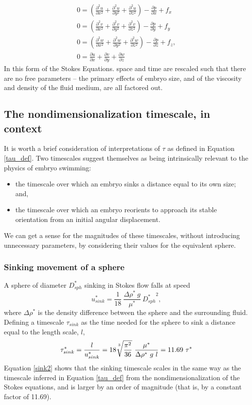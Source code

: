 \documentclass[10pt,a4paper]{article}
\def\non{\nonumber}
\def\p{\partial}
\begin{document}
\begin{eqnarray}\label{Stokes2}
	0 = \left( \frac{\p^2 u}{\p x^2}+\frac{\p^2 u}{\p y^2}+\frac{\p^2 u}{\p z^2} \right) - \frac{\p p}{\p x} + f_x \non \\
	0 = \left( \frac{\p^2 v}{\p x^2}+\frac{\p^2 v}{\p y^2}+\frac{\p^2 v}{\p z^2} \right) - \frac{\p p}{\p y} + f_y \non \\
	0 = \left( \frac{\p^2 w}{\p x^2}+\frac{\p^2 w}{\p y^2}+\frac{\p^2 w}{\p z^2} \right) - \frac{\p p}{\p z} + f_z , \non \\
	0 =  \frac{\p u}{\p {x}}+\frac{\p v}{\p {y}}+\frac{\p w}{\p {z}}
\end{eqnarray}
In this form of the Stokes Equations. space and time are rescaled such that there are no free parameters -- the primary effects of embryo size, and of the viscosity and density of the fluid medium, are all factored out.  

\subsection{The nondimensionalization timescale, in context}
It is worth a brief consideration of interpretations of $\tau$ as defined in Equation \ref{tau_def}.
Two timescales suggest themselves as being intrinsically relevant to the physics of embryo swimming:
\begin{itemize}
	\item the timescale over which an embryo sinks a distance equal to its own size; and,
	\item the timescale over which an embryo reorients to approach its stable orientation from an initial angular displacement.
\end{itemize}
We can get a sense for the magnitudes of these timescales, without introducing unnecessary parameters, by considering their values for the equivalent sphere.

\subsubsection{Sinking movement of a sphere}\label{SinkSect}
A sphere of diameter $D_{sph}^*$ sinking in Stokes flow falls at speed
 \begin{equation}\label{sink1}
 	u_{sink}^* = \frac{1}{18} ~ \frac{\Delta \rho^* ~ g}{\mu^*}  ~ {D_{sph}^*}^2,
 \end{equation}
where $\Delta \rho^*$ is the density difference between the sphere and the surrounding fluid.
Defining a timescale $\tau_{sink}$ as the time needed for the sphere to sink a distance equal to the length scale, $l$,
\begin{equation}\label{sink2}
	\tau^*_{sink} = \frac{l}{u_{sink}^*} = 18 \sqrt[\uproot{5}3]{\frac{\pi^2}{36}} ~ \frac{\mu^*}{\Delta \rho^* ~ g ~ l} 
	              = 11.69 ~ \tau^*
\end{equation}
Equation \ref{sink2} shows that the sinking timescale scales in the same way as the timescale inferred in Equation \ref{tau_def} from the nondimensionalization of the Stokes equations, and is larger by an order of magnitude (that is, by a constant factor of 11.69).
\end{document}
